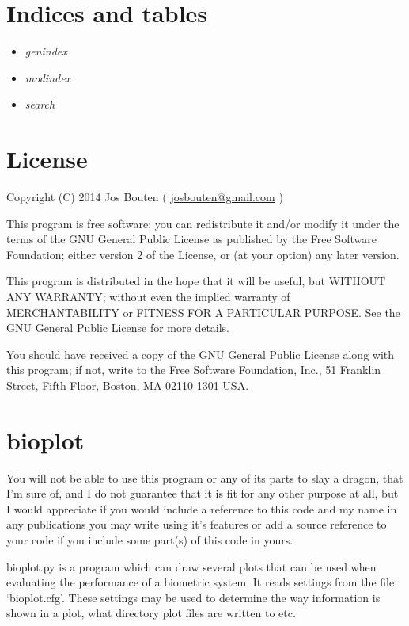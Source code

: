 \documentclass[letterpaper,10pt,english]{sphinxmanual}
\begin{document}
\chapter{Indices and tables}
\label{index:indices-and-tables}\begin{itemize}
\item {} 
\emph{genindex}

\item {} 
\emph{modindex}

\item {} 
\emph{search}

\end{itemize}


\chapter{License}
\label{index:license}
Copyright (C) 2014 Jos Bouten ( \href{mailto:josbouten@gmail.com}{josbouten@gmail.com} )

This program is free software; you can redistribute it and/or modify
it under the terms of the GNU General Public License as published by
the Free Software Foundation; either version 2 of the License, or
(at your option) any later version.

This program is distributed in the hope that it will be useful,
but WITHOUT ANY WARRANTY; without even the implied warranty of
MERCHANTABILITY or FITNESS FOR A PARTICULAR PURPOSE.  See the
GNU General Public License for more details.

You should have received a copy of the GNU General Public License along
with this program; if not, write to the Free Software Foundation, Inc.,
51 Franklin Street, Fifth Floor, Boston, MA 02110-1301 USA.


\chapter{bioplot}
\label{index:bioplot}
You will not be able to use this program or any of its parts to slay a dragon, that
I'm sure of, and I do not guarantee that it is fit for any other purpose at all, but
I would appreciate if you would include a reference to this code and my name
in any publications you may write using it's features or add a source reference
to your code if you include some part(s) of this code in yours.

bioplot.py is a program which can draw several plots that can be used
when evaluating the performance of a biometric system. It reads settings from the file `bioplot.cfg'.
These settings may be used to determine the way information is shown in a plot, what directory plot files are written to etc.
\end{document}
